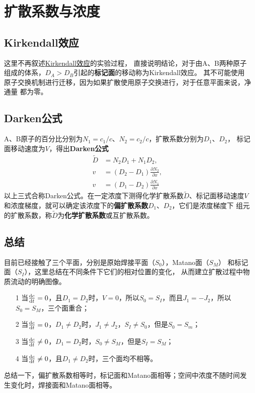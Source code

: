     \section{扩散系数与浓度}
        \subsection{Kirkendall效应}
            这里不再叙述\href{http://www.phase-trans.msm.cam.ac.uk/kirkendall.html}{Kirkendall效应}的实验过程，
            直接说明结论，对于由A、B两种原子组成的体系，$D_A>D_B$引起的\textbf{标记面}的移动称为Kirkendall效应。
            其不可能使用原子交换机制进行迁移，因为如果扩散使用原子交换进行，对于任意平面来说，净通量
            都为零。
        \subsection{Darken公式}
            A、B原子的百分比分别为$N_1=c_1/c$、$N_2=c_2/c$，扩散系数分别为$D_1$、$D_2$，
            标记面移动速度为$V$，得出\textbf{Darken公式}
            \begin{align}
                \widetilde{D}&=N_{2} D_{1}+N_{1} D_{2},\\
                v&=\left(D_{2}-D_{1}\right) \frac{\partial N_{2}}{\partial x},\\
                v&=\left(D_{1}-D_{2}\right) \frac{\partial N_{1}}{\partial x}
            \end{align}
            以上三式合称Darken公式。在一定浓度下测得化学扩散系数$\widetilde{D}$、标记面移动速度$V$
            和浓度梯度，就可以确定该浓度下的\textbf{偏扩散系数}$D_1$、$D_2$，它们是浓度梯度下
            组元的扩散系数，称$\widetilde{D}$为\textbf{化学扩散系数}或互扩散系数。

        \subsection{总结}
            目前已经接触了三个平面，分别是原始焊接平面（$S_0$），Matano面（$S_M$）
            和标记面（$S_I$），这里总结在不同条件下它们的相对位置的变化，
            从而建立扩散过程中物质流动的明确图像。
            \begin{itemize}
                \item[1] 当$\frac{\mathop{}\!\mathrm{d} c}{\mathop{}\!\mathrm{d} t}=0$，且$D_1=D_2$时，$V=0$，所以$S_0=S_I$，而且$J_1=-J_2$，所以$S_0=S_M$，三个面重合；
                \item[2] 当$\frac{\mathop{}\!\mathrm{d} c}{\mathop{}\!\mathrm{d} t}=0$，$D_1\neq D_2$时，$J_1\neq J_2$，$S_I\neq S_0$，但是$S_0=S_m$；
                \item[3] 当$\frac{\mathop{}\!\mathrm{d} c}{\mathop{}\!\mathrm{d} t}\neq0$，$D_1=D_2$时，$S_0\neq S_M$，但是$S_I=S_M$；
                \item[4] 当$\frac{\mathop{}\!\mathrm{d} c}{\mathop{}\!\mathrm{d} t}\neq0$，且$D_1\neq D_2$时，三个面均不相等。
            \end{itemize}
            总结一下，偏扩散系数相等时，标记面和Matano面相等；空间中浓度不随时间发生变化时，焊接面和Matano面相等。

